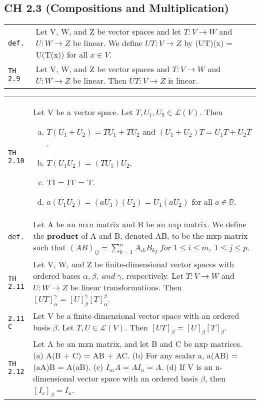 \documentclass[10pt,landscape]{article}
\begin{document}
\begin{multicols}{3}
\section{CH 2.3 (Compositions and Multiplication)}
\begin{tabular}{@{}p{\the\MyLen}%
                @{}p{\linewidth-\the\MyLen}@{}} %
\verb!def.! & Let V, W, and Z be vector spaces and let $T:V\rightarrow W$ and $U:W\rightarrow Z$ be linear. We define $UT:V\rightarrow Z$ by (UT)(x) = U(T(x)) for all $x\!\in\!V$.\\
\verb!TH 2.9! & Let V, W, and Z be vector spaces and $T:V\rightarrow W$ and $U:W\rightarrow Z$ be linear. Then $UT:V\rightarrow Z$ is linear.\\
\end{tabular}
\begin{tabular}{@{}p{\the\MyLen}%
                @{}p{\linewidth-\the\MyLen}@{}} %
\verb!TH 2.10! & Let V be a vector space. Let $T, U_1, U_2 \in \mathscr{L}(V)$. Then
			 \begin{enumerate}[a)]
			 \item $T(U_1 + U_2) = TU_1 + TU_2$ and $(U_1 + U_2)T = U_1T + U_2T$.
			 \item $T(U_1 U_2) = (TU_1)U_2$.
			 \item TI = IT = T.
			 \item $a(U_1 U_2) = (aU_1)(U_2) = U_1(aU_2)$ for all $a\!\in\!\mathbb{R}$.
			 \end{enumerate}\\
\verb!def.! & Let A be an mxn matrix and B be an nxp matrix. We define the \textbf{product} of A and B, denoted AB, to be the mxp matrix such that $(AB)_{ij} = \sum_{k=1}^n A_{ik}B_{kj}\; for\; 1\leq i \leq m,\; 1\leq j \leq p$.\\
\verb!TH 2.11! & Let V, W, and Z be finite-dimensional vector spaces with ordered bases $\alpha , \beta ,\; and\;\gamma$, respectively. Let $T:V\rightarrow W$ and $U:W\rightarrow Z$ be linear transformations. Then $[UT]_\alpha^\gamma = [U]_\beta^\gamma [T]_\alpha^\beta$.\\
\verb!2.11 C! & Let V be a finite-dimensional vector space with an ordered basis $\beta$. Let $T, U\!\in\!\mathscr{L}(V)$. Then $[UT]_\beta = [U]_\beta[T]_\beta$.\\
\verb!TH 2.12! & Let A be an mxn matrix, and let B and C be nxp matrices.  (a) A(B + C) = AB + AC. (b) For any scalar a,  a(AB) = (aA)B = A(aB). (c) $I_mA = AI_n = A$. (d) If V is an n-dimensional vector space with an ordered basis $\beta$, then $[I_v]_\beta = I_n$.\\

\end{tabular}
\end{multicols}
\end{document}
